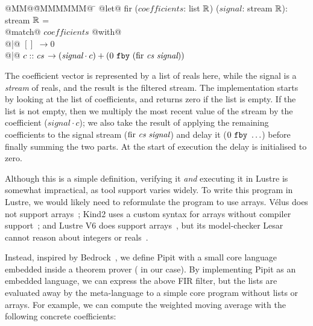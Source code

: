 \documentclass[sigplan,screen, review]{acmart}
\begin{document}
\newcommand\signal{\textit{signal}}
\begin{tabbing}
  @MM@\= @MMMMMM@ \= \kill
  @let@ fir ($\textit{coefficients}$: list $\mathbb{R}$) ($\signal$: stream $\mathbb{R}$): stream $\mathbb{R}$ = \\
    \> @match@ $\textit{coefficients}$ @with@ \\
    \> @|@ $[]$ \> $\to 0$ \\
    \> @|@ $c :: \textit{cs} $ \> $\to (\signal \cdot c) + (\xfby{0}{(\mbox{fir~} \cs~\signal)})$
\end{tabbing}

The coefficient vector is represented by a list of reals here, while the signal is a \emph{stream} of reals, and the result is the filtered stream.
The implementation starts by looking at the list of coefficients, and returns zero if the list is empty.
If the list is not empty, then we multiply the most recent value of the stream by the coefficient ($\signal \cdot c$); we also take the result of applying the remaining coefficients to the signal stream ($\mbox{fir~} \cs ~ \signal$) and delay it ($0~\texttt{fby}~\ldots$) before finally summing the two parts.
At the start of execution the delay is initialised to zero.

Although this is a simple definition, verifying it \emph{and} executing it in Lustre is somewhat impractical, as tool support varies widely.
To write this program in Lustre, we would likely need to reformulate the program to use arrays.
Vélus does not support arrays~\cite{bourke2017formally}; Kind2 uses a custom syntax for arrays without compiler support~\cite{champion2016kind2}; and Lustre V6 does support arrays~\cite{jahier2016lustre}, but its model-checker Lesar cannot reason about integers or reals~\cite{raymond2008synchronous}.

Instead, inspired by Bedrock~\cite{chlipala2013bedrock}, we define Pipit with a small core language embedded inside a theorem prover (\fstar{} in our case).
By implementing Pipit as an embedded language, we can express the above FIR filter, but the lists are evaluated away by the meta-language to a simple core program without lists or arrays.
For example, we can compute the weighted moving average with the following concrete coefficients:
\end{document}
